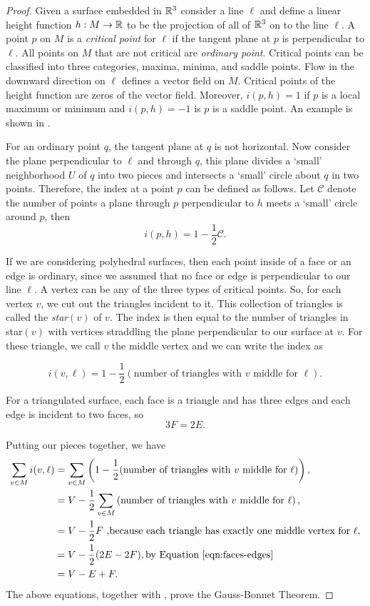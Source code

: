 \begin{proof}
Given a surface embedded in $\mathbb{R}^3$ consider a line $\ell$ and define a 
linear height function $h:M \to \mathbb{R}$
to be the projection of all of $\mathbb{R}^3$ on to the line $\ell$. A point $p$ on $M$
is a \emph{critical point} for $\ell$ if the tangent plane at $p$ is perpendicular to $\ell$.
All points on $M$ that are not critical are \emph{ordinary point}.
Critical points can be classified into three categories, maxima, minima, and saddle points.
Flow in the downward direction on $\ell$ defines a vector field on $M$.
Critical points of the height function are zeros of the vector field.
Moreover, $i(p,h)=1$ if $p$ is a  local maximum or minimum and $i(p,h)=-1$ is $p$ is a saddle point.
An example is shown in .


For an ordinary point $q$, the tangent plane at $q$ is not horizontal. 
Now consider the plane perpendicular to $\ell$ and through $q$, this plane
divides a `small' neighborhood $U$ of $q$ into two pieces and intersects
a `small' circle about $q$ in two points.
Therefore, the index at a point $p$ can be defined as follows.
Let $\mathcal{C}$ denote the number of points a plane through $p$ perpendicular
to $h$ meets a `small' circle around $p$, then 
$$i(p,h)=1-\frac{1}{2}\mathcal{C}.$$

If we are considering polyhedral surfaces, then each point inside of a face or an edge
is ordinary, since we assumed that no face or edge is perpendicular to our line $\ell.$
A vertex can be any of the three types of critical points.
So, for each vertex $v$, we cut out the triangles incident to it. This collection of triangles
is called the \emph{star}$(v)$ of $v$. 
The index is then equal to the number of triangles in star$(v)$ with vertices
straddling the plane perpendicular to our surface at $v$. For these triangle,
we call $v$ the middle vertex and we can write the index as

$$i(v,\ell)=1-\frac{1}{2} \left(\text{number of triangles with } v \text{ middle for } \ell\right).$$



For a triangulated surface, each face is a triangle and has three edges and each
edge is incident to two faces, so
\begin{equation} \label{eqn:faces-edges}
	3F=2E.
\end{equation}

Putting our pieces together, we have
\begin{align}
\sum_{v\in M}i(v,\ell) &=\sum_{v\in M} \left(1-\frac{1}{2}(\text{number of triangles with } v \text{ middle for } \ell)\right),  \\ \nonumber
       &=V - \frac{1}{2}\sum_{v\in M} \left(\text{number of triangles with } v \text{ middle for } \ell\right), \\ \nonumber
       &=V-\frac{1}{2} F \text{ ,because each triangle has exactly one middle vertex for  } \ell,\\ \nonumber
       &= V-\frac{1}{2}(2E-2F), \text{by \eqnref{faces-edges}}\\ \nonumber
       &=V-E+F. \nonumber 
\end{align}
The above equations, together with , prove the Gauss-Bonnet Theorem.


\end{proof}
